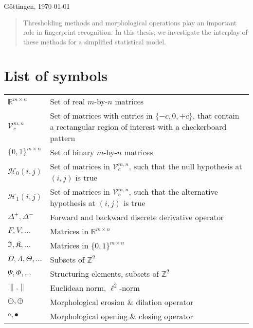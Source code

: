 \documentclass[a4paper,12pt]{article}
\newcommand{\norm}[1]{\lVert#1\rVert}
\theoremstyle{plain}
\theoremstyle{definition}
\numberwithin{equation}{section}
\begin{document}
\begin{titlepage}

{\large Göttingen, \today}\\[2cm] %

\begin{abstract}
	Thresholding methods and morphological operations play an important role in fingerprint recognition. In this thesis, we investigate the interplay of these methods for a simplified statistical model.
\end{abstract}
\end{titlepage}

\newpage

\tableofcontents

\newpage


\section*{List of symbols}

\begin{table}[h!]
	\begin{tabular}{p{2.5cm}p{10.5cm}}
		$\mathbb{R}^{m \times n}$ & Set of real $m$-by-$n$ matrices \\
		$\mathcal{V}_c^{m, n}$ & Set of matrices with entries in $\{ -c, 0, + c \}$, that contain a rectangular region of interest with a checkerboard pattern \\
		$\{ 0, 1 \}^{m \times n}$ & Set of binary $m$-by-$n$ matrices \\
		$\mathcal{H}_0(i, j)$ & Set of matrices in $\mathcal{V}_c^{m, n}$, such that the null hypothesis at $(i, j)$ is true \\
		$\mathcal{H}_1(i, j)$ & Set of matrices in $\mathcal{V}_c^{m, n}$, such that the alternative hypothesis at $(i, j)$ is true \\
		$\Delta^+, \Delta^-$ & Forward and backward discrete derivative operator \\
		$F, V, \dots$ & Matrices in $\mathbb{R}^{m \times n}$ \\
		$\mathfrak{I}, \mathfrak{K}, \dots$ & Matrices in $\{ 0, 1 \}^{m \times n}$ \\
		$\Omega, \varLambda, \Theta, \dots$ & Subsets of $\mathbb{Z}^2$ \\
		$\Psi, \Phi, \dots$ & Structuring elements, subsets of $\mathbb{Z}^2$ \\
		$\norm{.}$ & Euclidean norm, $\ell^2$-norm \\
		$\ominus, \oplus$ & Morphological erosion \& dilation operator \\
		$\circ, \bullet$ & Morphological opening \& closing operator \\
	\end{tabular}
\end{table}
\end{document}
